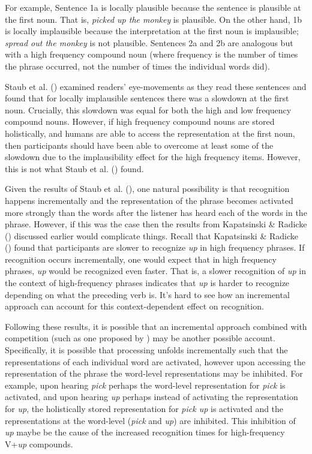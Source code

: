 \documentclass[
  12pt,
  letterpaper,
]{scrreprt}
\begin{document}
For example, Sentence 1a is locally plausible because the sentence is
plausible at the first noun. That is, \emph{picked up the monkey} is
plausible. On the other hand, 1b is locally implausible because the
interpretation at the first noun is implausible; \emph{spread out the
monkey} is not plausible. Sentences 2a and 2b are analogous but with a
high frequency compound noun (where frequency is the number of times the
phrase occurred, not the number of times the individual words did).

Staub et al. ()
examined readers' eye-movements as they read these sentences and found
that for locally implausible sentences there was a slowdown at the first
noun. Crucially, this slowdown was equal for both the high and low
frequency compound nouns. However, if high frequency compound nouns are
stored holistically, and humans are able to access the representation at
the first noun, then participants should have been able to overcome at
least some of the slowdown due to the implausibility effect for the high
frequency items. However, this is not what Staub et al.
() found.

Given the results of Staub et al.
(), one natural
possibility is that recognition happens incrementally and the
representation of the phrase becomes activated more strongly than the
words after the listener has heard each of the words in the phrase.
However, if this was the case then the results from Kapatsinski \&
Radicke ()
discussed earlier would complicate things. Recall that Kapatsinski \&
Radicke ()
found that participants are slower to recognize \emph{up} in high
frequency phrases. If recognition occurs incrementally, one would expect
that in high frequency phrases, \emph{up} would be recognized even
faster. That is, a slower recognition of \emph{up} in the context of
high-frequency phrases indicates that \emph{up} is harder to recognize
depending on what the preceding verb is. It's hard to see how an
incremental approach can account for this context-dependent effect on
recognition.

Following these results, it is possible that an incremental approach
combined with competition (such as one proposed by
)
may be another possible account. Specifically, it is possible that
processing unfolds incrementally such that the representations of each
individual word are activated, however upon accessing the representation
of the phrase the word-level representations may be inhibited. For
example, upon hearing \emph{pick} perhaps the word-level representation
for \emph{pick} is activated, and upon hearing \emph{up} perhaps instead
of activating the representation for \emph{up}, the holistically stored
representation for \emph{pick up} is activated and the representations
at the word-level (\emph{pick} and \emph{up}) are inhibited. This
inhibition of \emph{up} maybe be the cause of the increased recognition
times for high-frequency V+\emph{up} compounds.
\end{document}
